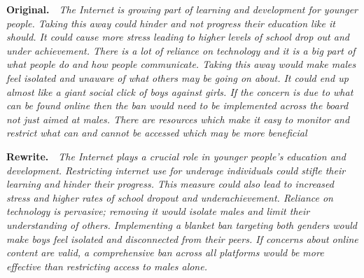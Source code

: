 \noindent\textbf{Original.}~~\textit{The Internet is growing part of learning and development for younger people. Taking this away could hinder and not progress their education like it should. It could cause more stress leading to higher levels of school drop out and under achievement. There is a lot of reliance on technology and it is a big part of what people do and how people communicate. Taking this away would make males feel isolated and unaware of what others may be going on about. It could end up almost like a giant social click of boys against girls. If the concern is due to what can be found online then the ban would need to be implemented across the board not just aimed at males. There are resources which make it easy to monitor and restrict what can and cannot be accessed which may be more beneficial}

\noindent\textbf{Rewrite.}~~\textit{The Internet plays a crucial role in younger people's education and development. Restricting internet use for underage individuals could stifle their learning and hinder their progress. This measure could also lead to increased stress and higher rates of school dropout and underachievement. Reliance on technology is pervasive; removing it would isolate males and limit their understanding of others. Implementing a blanket ban targeting both genders would make boys feel isolated and disconnected from their peers. If concerns about online content are valid, a comprehensive ban across all platforms would be more effective than restricting access to males alone.}

